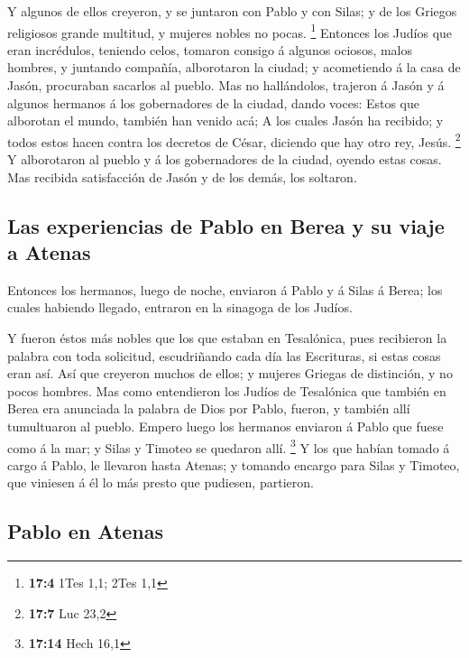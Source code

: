  Y algunos de ellos creyeron, y se juntaron con Pablo y
con Silas; y de los Griegos religiosos grande multitud, y mujeres nobles
no pocas. \footnote{\textbf{17:4} 1Tes 1,1; 2Tes 1,1} 
Entonces los Judíos que eran incrédulos, teniendo celos, tomaron consigo
á algunos ociosos, malos hombres, y juntando compañía, alborotaron la
ciudad; y acometiendo á la casa de Jasón, procuraban sacarlos al pueblo.
 Mas no hallándolos, trajeron á Jasón y á algunos hermanos
á los gobernadores de la ciudad, dando voces: Estos que alborotan el
mundo, también han venido acá;  A los cuales Jasón ha
recibido; y todos estos hacen contra los decretos de César, diciendo que
hay otro rey, Jesús. \footnote{\textbf{17:7} Luc 23,2}  Y
alborotaron al pueblo y á los gobernadores de la ciudad, oyendo estas
cosas.  Mas recibida satisfacción de Jasón y de los demás,
los soltaron.

\hypertarget{las-experiencias-de-pablo-en-berea-y-su-viaje-a-atenas}{%
\subsection{Las experiencias de Pablo en Berea y su viaje a
Atenas}\label{las-experiencias-de-pablo-en-berea-y-su-viaje-a-atenas}}

 Entonces los hermanos, luego de noche, enviaron á Pablo
y á Silas á Berea; los cuales habiendo llegado, entraron en la sinagoga
de los Judíos.

 Y fueron éstos más nobles que los que estaban en
Tesalónica, pues recibieron la palabra con toda solicitud, escudriñando
cada día las Escrituras, si estas cosas eran así.  Así
que creyeron muchos de ellos; y mujeres Griegas de distinción, y no
pocos hombres.  Mas como entendieron los Judíos de
Tesalónica que también en Berea era anunciada la palabra de Dios por
Pablo, fueron, y también allí tumultuaron al pueblo. 
Empero luego los hermanos enviaron á Pablo que fuese como á la mar; y
Silas y Timoteo se quedaron allí. \footnote{\textbf{17:14} Hech 16,1}
 Y los que habían tomado á cargo á Pablo, le llevaron
hasta Atenas; y tomando encargo para Silas y Timoteo, que viniesen á él
lo más presto que pudiesen, partieron.

\hypertarget{pablo-en-atenas}{%
\subsection{Pablo en Atenas}\label{pablo-en-atenas}}

